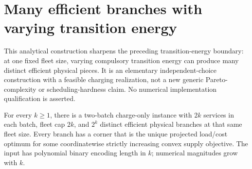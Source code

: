 \section{Many efficient branches with varying transition energy}
\label{app:exponentialtransition}
This analytical construction sharpens the preceding transition-energy
boundary: at one fixed fleet size, varying compulsory transition energy
can produce many distinct efficient physical pieces. It is an elementary
independent-choice construction with a feasible charging realization, not
a new generic Pareto-complexity or scheduling-hardness claim. No numerical
implementation qualification is asserted.

\begin{proposition}
\label{prop:exponentialtransition}
For every $k\ge1$, there is a two-batch charge-only instance with $2k$
services in each batch, fleet cap $2k$, and $2^k$ distinct efficient
physical branches at that same fleet size. Every branch has a corner
that is the unique projected load/cost optimum for some coordinatewise
strictly increasing convex supply objective. The input has polynomial
binary encoding length in $k$; numerical magnitudes grow with $k$.
\end{proposition}

